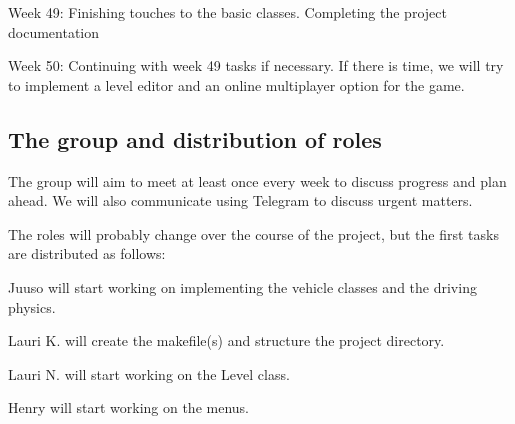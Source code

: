 \documentclass{article}
\begin{document}
Week 49: Finishing touches to the basic classes. Completing the project documentation

Week 50: Continuing with week 49 tasks if necessary. If there is time, we will try to implement a level editor and an online multiplayer option for the game.

\subsection*{The group and distribution of roles}
The group will aim to meet at least once every week to discuss progress and plan ahead. We will also communicate using Telegram to discuss urgent matters.

The roles will probably change over the course of the project, but the first tasks are distributed as follows:

Juuso will start working on implementing the vehicle classes and the driving physics.

Lauri K. will create the makefile(s) and structure the project directory.

Lauri N. will start working on the Level class.

Henry will start working on the menus.
\end{document}
